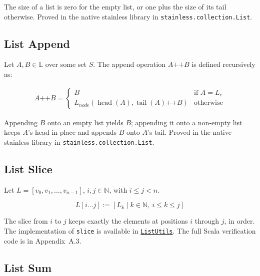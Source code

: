 The size of a list is zero for the empty list, or one plus the size of
its tail otherwise. Proved in the native stainless library in
\texttt{stainless.collection.List}.

\subsection{List Append}

Let $A, B \in \mathbb{L}$ over some set $S$. The append operation
$A \mathbin{\texttt{++}} B$ is defined recursively as:

\begin{equation*}
\begin{aligned}
A \mathbin{\texttt{++}} B =
\begin{cases}
B & \text{if } A = L_e \\
L_{node}(\operatorname{head}(A), \operatorname{tail}(A) \mathbin{\texttt{++}} B) & \text{otherwise}
\end{cases}
\end{aligned}
\end{equation*}

{\sloppy Appending $B$ onto an empty list yields $B$; appending it onto a
non-empty list keeps $A$'s head in place and appends $B$ onto $A$'s tail.
Proved in the native stainless library in \texttt{stainless.collection.List}.\par}

\subsection{List Slice}
\label{sec:list-slice}

Let $L = [v_0, v_1, \dots, v_{n-1}]$, $i, j \in \mathbb{N}$, with
$i \leq j < n$.

\begin{equation*}
L[i \dots j] := [ L_k \mid k \in \mathbb{N},\ i \leq k \leq j ]
\end{equation*}

The slice from $i$ to $j$ keeps exactly the elements at positions $i$
through $j$, in order. The implementation of \texttt{slice} is available
in
\href{https://github.com/thiagomata/prime-numbers/blob/list-article-v1.0.0/src/main/scala/v1/chapter3/list/ListUtils.scala#slice}{\texttt{ListUtils}}.
The full Scala verification code is in Appendix~A.3.

\subsection{List Sum}

